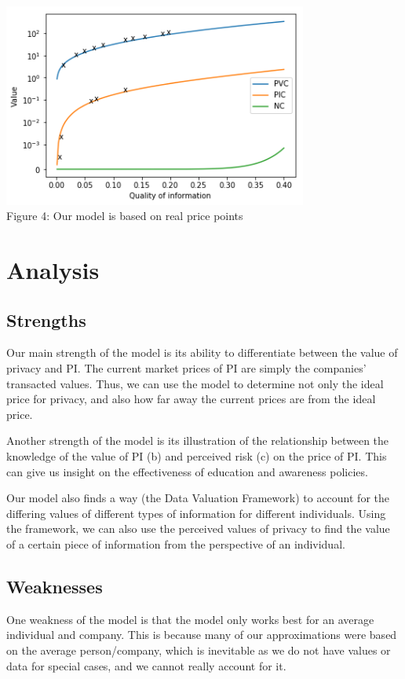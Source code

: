 \documentclass{icmmcm}
\begin{document}

\includegraphics[width=0.75\textwidth]{Picture4.png}
\\ \caption{Figure 4: Our model is based on real price points}


\section{Analysis}
\subsection{Strengths}
Our main strength of the model is its ability to differentiate between the value of privacy and PI. The current market prices of PI are simply the companies' transacted values. Thus, we can use the model to determine not only the ideal price for privacy, and also how far away the current prices are from the ideal price. 

Another strength of the model is its illustration of the relationship between the knowledge of the value of PI (b) and perceived risk (c) on the price of PI. This can give us insight on the effectiveness of education and awareness policies.

Our model also finds a way (the Data Valuation Framework) to account for the differing values of different types of information for different individuals. Using the framework, we can also use the perceived values of privacy to find the value of a certain piece of information from the perspective of an individual.

\subsection{Weaknesses}
One weakness of the model is that the model only works best for an average individual and company. This is because many of our approximations were based on the average person/company, which is inevitable as we do not have values or data for special cases, and we cannot really account for it. 
\end{document}

